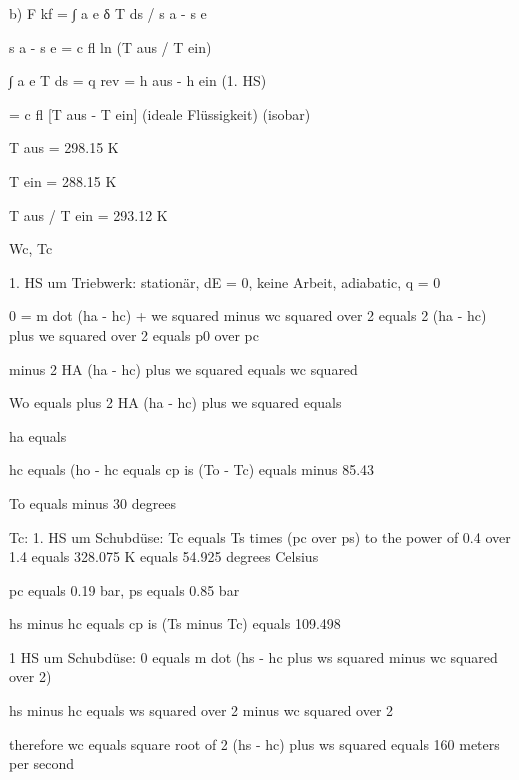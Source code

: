 b) F kf = ∫ a e δ T ds / s a - s e

s a - s e = c fl ln (T aus / T ein)

∫ a e T ds = q rev = h aus - h ein (1. HS)

= c fl [T aus - T ein] (ideale Flüssigkeit) (isobar)

T aus = 298.15 K

T ein = 288.15 K

T aus / T ein = 293.12 K

Wc, Tc

1. HS um Triebwerk:
stationär, dE = 0, keine Arbeit, adiabatic, q = 0

0 = m dot (ha - hc) + we squared minus wc squared over 2 equals 2 (ha - hc) plus we squared over 2 equals p0 over pc

minus 2 HA (ha - hc) plus we squared equals wc squared

Wo equals plus 2 HA (ha - hc) plus we squared equals

ha equals

hc equals (ho - hc equals cp is (To - Tc) equals minus 85.43

To equals minus 30 degrees

Tc:
1. HS um Schubdüse:
Tc equals Ts times (pc over ps) to the power of 0.4 over 1.4 equals 328.075 K equals 54.925 degrees Celsius

pc equals 0.19 bar, ps equals 0.85 bar

hs minus hc equals cp is (Ts minus Tc) equals 109.498

1 HS um Schubdüse:
0 equals m dot (hs - hc plus ws squared minus wc squared over 2)

hs minus hc equals ws squared over 2 minus wc squared over 2

therefore wc equals square root of 2 (hs - hc) plus ws squared equals 160 meters per second